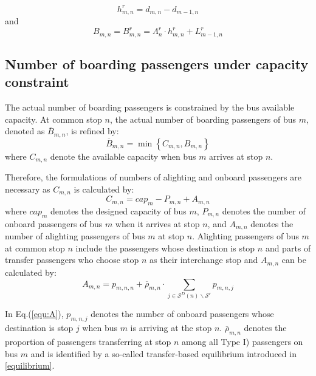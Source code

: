 \documentclass[smallextended]{svjour3}       %
\begin{document}
\begin{Abstract}
\begin{equation}
    h_{m,n}^{r}=d_{m,n}-d_{m-1,n}
\end{equation}
and
\begin{equation}
    \label{equ:singleB}
    B_{m,n} = B_{m,n}^{r} = \Lambda_{n}^{r} \cdot h_{m,n}^{r} + L_{m-1,n}^{r} 
\end{equation}

\subsection{Number of boarding passengers under capacity constraint}\label{barB}
The actual number of boarding passengers is constrained by the bus available capacity.
At common stop $n$, the actual number of boarding passengers of bus $m$, 
denoted as $\overline{B}_{m,n}$, is refined by:
\begin{equation}
    \label{equ:barB}
    \overline{B}_{m,n} = \min \left\{C_{m,n},B_{m,n}\right\}
\end{equation}
where $C_{m,n}$ denote the available capacity when bus $m$ arrives at stop $n$.

Therefore, the formulations of numbers of alighting and onboard passengers are necessary as $C_{m,n}$ is calculated by: 
\begin{equation}
    \label{equ:C}
    C_{m,n} = cap_{m} - P_{m,n} + A_{m,n}
\end{equation}
where $cap_{m}$ denotes the designed capacity of bus $m$, 
$P_{m,n}$ denotes the number of onboard passengers of bus $m$ when it arrives at stop $n$, 
and $A_{m,n}$ denotes the number of alighting passengers of bus $m$ at stop $n$.
Alighting passengers of bus $m$ at common stop $n$ include the passengers 
whose destination is stop $n$ and parts of transfer passengers who choose stop $n$ as their interchange stop 
and $A_{m,n}$ can be calculated by:
\begin{equation}
    \label{equ:A}
    A_{m,n} = p_{m,n,n} + \overline{\rho}_{m,n} \cdot \sum_{j \in \mathcal{S}^{D}(n)\backslash\mathcal{S}^{r}}  p_{m,n,j}
\end{equation}

In \textup{Eq.(\ref{equ:A})}, $p_{m,n,j}$ denotes the number of onboard passengers whose destination is stop $j$  
when bus $m$ is arriving at the stop $n$. 
$\overline{\rho}_{m,n}$ denotes the proportion of passengers transferring at stop $n$ 
among all Type I) passengers on bus $m$ and is identified by a so-called
transfer-based equilibrium introduced in \ref{equilibrium}.


\end{Abstract}
\end{document}
